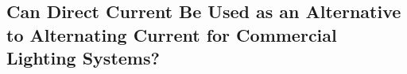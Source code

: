 \subsection{Can Direct Current Be Used as an Alternative to Alternating Current for Commercial Lighting Systems?}